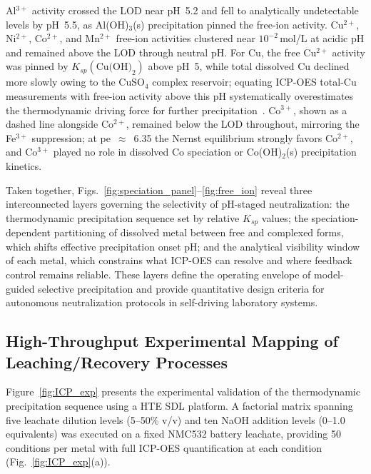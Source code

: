 \documentclass[final,2p,times]{elsarticle}
\begin{document}
Al$^{3+}$ activity crossed the LOD near pH~5.2 and fell to analytically undetectable levels by pH~5.5, as Al(OH)$_3$(s) precipitation pinned the free-ion activity. Cu$^{2+}$, Ni$^{2+}$, Co$^{2+}$, and Mn$^{2+}$ free-ion activities clustered near $10^{-2}$\,mol/L at acidic pH and remained above the LOD through neutral pH. For Cu, the free Cu$^{2+}$ activity was pinned by $K_{sp}(\text{Cu(OH)}_2)$ above pH~5, while total dissolved Cu declined more slowly owing to the CuSO$_4$ complex reservoir; equating ICP-OES total-Cu measurements with free-ion activity above this pH systematically overestimates the thermodynamic driving force for further precipitation~\cite{crundwell_extractive_2011, stumm_aquatic_1996}. Co$^{3+}$, shown as a dashed line alongside Co$^{2+}$, remained below the LOD throughout, mirroring the Fe$^{3+}$ suppression; at pe~$\approx$~6.35 the Nernst equilibrium strongly favors Co$^{2+}$, and Co$^{3+}$ played no role in dissolved Co speciation or Co(OH)$_2$(s) precipitation kinetics.

Taken together, Figs.~\ref{fig:speciation_panel}--\ref{fig:free_ion} reveal three interconnected layers governing the selectivity of pH-staged neutralization: the thermodynamic precipitation sequence set by relative $K_{sp}$ values; the speciation-dependent partitioning of dissolved metal between free and complexed forms, which shifts effective precipitation onset pH; and the analytical visibility window of each metal, which constrains what ICP-OES can resolve and where feedback control remains reliable. These layers define the operating envelope of model-guided selective precipitation and provide quantitative design criteria for autonomous neutralization protocols in self-driving laboratory systems.


\subsection{High-Throughput Experimental Mapping of Leaching/Recovery Processes}

Figure~\ref{fig:ICP_exp} presents the experimental validation of the thermodynamic precipitation sequence using a HTE SDL platform. A factorial matrix spanning five leachate dilution levels (5--50\% v/v) and ten NaOH addition levels (0--1.0 equivalents) was executed on a fixed NMC532 battery leachate, providing 50 conditions per metal with full ICP-OES quantification at each condition (Fig.~\ref{fig:ICP_exp}(a)).
\end{document}
